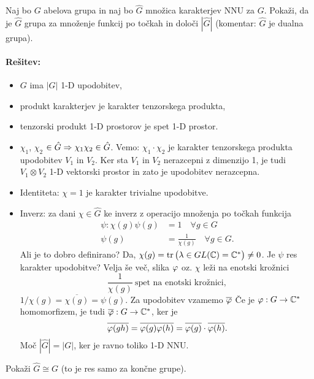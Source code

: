 \begin{zgled}
	Naj bo $G$ abelova grupa in naj bo $\hat{G}$ mno\v zica karakterjev NNU za $G$. Poka\v zi, da je $\hat{G}$ grupa za
	mno\v zenje funkcij po to\v ckah in dolo\v ci $|\hat{G}|$ (komentar: $\hat{G}$ je dualna grupa).

	\paragraph{Re\v sitev:}
	\begin{itemize}
		\item{$G$ ima $|G|$ 1-D upodobitev,}
		\item{produkt karakterjev je karakter tenzorskega produkta,}
		\item{tenzorski produkt 1-D prostorov je spet 1-D prostor.}
		\item{$\chi_1$, $\chi_2$ $\in \hat{G} \Rightarrow \chi_1 \chi_2 \in \hat{G}$. Vemo: $\chi_1 \cdot \chi_2$ je karakter
			tenzorskega produkta upodobitev $V_1$ in $V_2$. Ker sta $V_1$ in $V_2$ nerazcepni z dimenzijo 1, je tudi
			$V_1 \otimes V_2$ 1-D vektorski prostor in zato je upodobitev nerazcepna.}
		\item{Identiteta: $\chi = 1$ je karakter trivialne upodobitve.}
		\item{Inverz: za dani $\chi \in \hat{G}$ ke inverz z operacijo mno\v zenja po to\v ckah funkcija
			\begin{align*}
				\psi : \chi(g) \psi (g) &= 1\quad \forall g \in G \\
				\psi(g) &= \frac{1}{\chi(g)}\quad \forall g \in G.
			\end{align*}
			Ali je to dobro definirano? Da, $\chi(g) = \operatorname{tr}\big(\lambda \in GL(\mathbb{C}) = \mathbb{C}^*\big) \neq 0$. Je $\psi$ res
			karakter upodobitve? Velja \v se ve\v c, slika $\varphi$ oz. $\chi$ le\v zi na enotski kro\v znici
			\[
				\frac{1}{\chi(g)}\ \text{spet na enotski kro\v znici},
			\]
			$1/\chi(g) = \overline{\chi(g)} = \psi(g)$. Za upodobitev vzamemo $\overline{\varphi}$ \v Ce je $\varphi : G \to \mathbb{C}^*$
			homomorfizem, je tudi $\overline{\varphi} : G \to \mathbb{C}^*$, ker je 
			\[
				\overline{\varphi(gh)} = \overline{\varphi(g)\varphi(h)} = \overline{\varphi(g)} \cdot \overline{\varphi(h)}.
			\]
			Mo\v c $|\hat{G}| = |G|$, ker je ravno toliko 1-D NNU.}
	\end{itemize}
\end{zgled}

\begin{zgled}
	Poka\v zi $\hat{G} \cong G$ (to je res samo za kon\v cne grupe).
\end{zgled}
